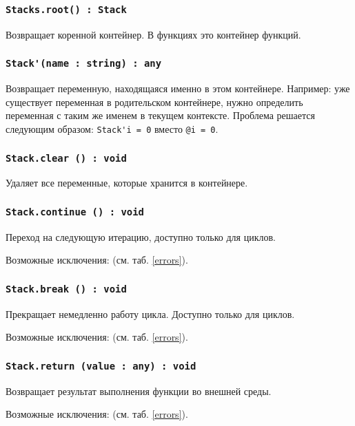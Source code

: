 \subsubsection{\lstinline|Stacks.root() : Stack|}

Возвращает коренной контейнер. В функциях это контейнер функций.

\subsubsection{\lstinline|Stack'(name : string) : any|}

Возвращает переменную, находящаяся именно в этом контейнере. Например: уже существует переменная  в родительском контейнере, нужно определить переменная с таким же именем в текущем контексте. Проблема решается следующим образом: \lstinline|Stack'i = 0| вместо \lstinline|@i = 0|.

\subsubsection{\lstinline|Stack.clear () : void|}

Удаляет все переменные, которые хранится в контейнере.

\subsubsection{\lstinline|Stack.continue () : void|}

Переход на следующую итерацию, доступно только для циклов.

Возможные исключения:  (см. таб. \ref{errors}).

\subsubsection{\lstinline|Stack.break () : void|}

Прекращает немедленно работу цикла. Доступно только для циклов.

Возможные исключения:  (см. таб. \ref{errors}).

\subsubsection{\lstinline|Stack.return (value : any) : void|}

Возвращает результат выполнения функции во внешней среды.

Возможные исключения:  (см. таб. \ref{errors}).

